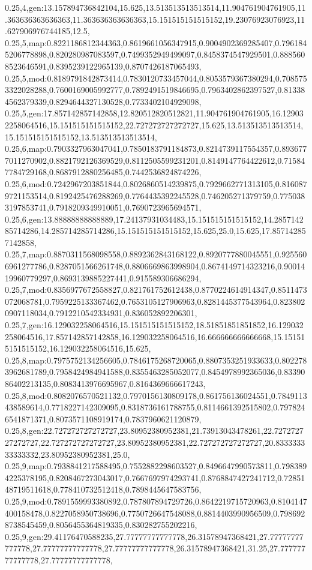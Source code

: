 0.25,4,gen:13.157894736842104,15.625,13.513513513513514,11.904761904761905,11.363636363636363,11.363636363636363,15.151515151515152,19.23076923076923,11.627906976744185,12.5,
0.25,5,map:0.8221186812344363,0.8619661056347915,0.9004902369285407,0.7961845206778898,0.820280987083597,0.7499352949499097,0.8458374547929501,0.8885608523646591,0.8395239122965139,0.8707426187065493,
0.25,5,mod:0.8189791842873414,0.7830120733457044,0.8053579367380294,0.7085753322028288,0.7600169005992777,0.7892491519846695,0.7963402862397527,0.813384562379339,0.8294644327130528,0.7733402104929098,
0.25,5,gen:17.857142857142858,12.820512820512821,11.904761904761905,16.129032258064516,15.151515151515152,22.727272727272727,15.625,13.513513513513514,15.151515151515152,13.513513513513514,
0.25,6,map:0.7903327963047041,0.7850183791184873,0.8214739117554357,0.8936777011270902,0.8821792126369529,0.8112505599231201,0.8149147764422612,0.715847784729168,0.8687912880256485,0.7442536824874226,
0.25,6,mod:0.7242967203851844,0.8026860514239875,0.7929662771313105,0.8160879721153514,0.8192425476288269,0.7764435392245528,0.746205271379759,0.7750383197853741,0.7918209349910051,0.7690723965694571,
0.25,6,gen:13.88888888888889,17.24137931034483,15.151515151515152,14.285714285714286,14.285714285714286,15.151515151515152,15.625,25.0,15.625,17.857142857142858,
0.25,7,map:0.8870311568098558,0.8892362843168122,0.8920777880045551,0.9255606961277786,0.8287051566261748,0.8806669863998904,0.8674149714323216,0.9001419960779297,0.8693139885227441,0.915589306686294,
0.25,7,mod:0.8356977672558827,0.821761752612438,0.8770224614914347,0.8511473072068781,0.7959225133367462,0.7653105127906963,0.8281445377543964,0.8238020907118034,0.7912210542334931,0.836052892206301,
0.25,7,gen:16.129032258064516,15.151515151515152,18.51851851851852,16.129032258064516,17.857142857142858,16.129032258064516,16.666666666666668,15.151515151515152,16.129032258064516,15.625,
0.25,8,map:0.7975752134256605,0.7846175268720065,0.8807353251933633,0.8022783962681789,0.7958424984941588,0.8355463285052077,0.8454978992365036,0.8339086402213135,0.8083413976695967,0.8164369666617243,
0.25,8,mod:0.8082076570521132,0.7970156130809178,0.861756136024551,0.7849113438589614,0.7718227142309095,0.8318736161788755,0.8114661392515802,0.7978246541871371,0.8073571108919174,0.7837960621120879,
0.25,8,gen:22.727272727272727,23.80952380952381,21.73913043478261,22.727272727272727,22.727272727272727,23.80952380952381,22.727272727272727,20.833333333333332,23.80952380952381,25.0,
0.25,9,map:0.7938841217588495,0.7552882298603527,0.8496647990573811,0.7983894225378195,0.8208467273043017,0.7667697974293741,0.8768847427241712,0.7285148719511618,0.778410732512418,0.7898445647583756,
0.25,9,mod:0.7891559993380892,0.787807894729726,0.8642219715720963,0.8104147400158478,0.8227058950738696,0.7750726647548088,0.8814403990956509,0.7986928738545459,0.8056455364819335,0.830282755202216,
0.25,9,gen:29.41176470588235,27.77777777777778,26.31578947368421,27.77777777777778,27.77777777777778,27.77777777777778,26.31578947368421,31.25,27.77777777777778,27.77777777777778,
